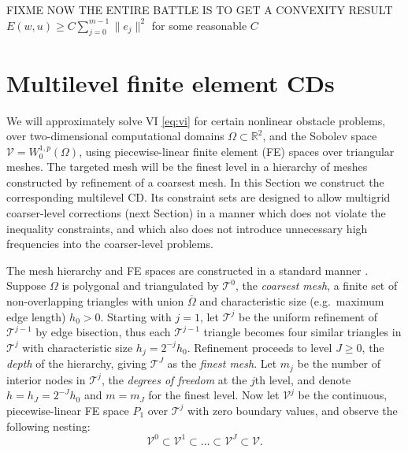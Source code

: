 \documentclass[letterpaper,final,12pt,reqno]{amsart}
\theoremstyle{cstyle}
\theoremstyle{cstyle*}
\theoremstyle{dstyle}
\numberwithin{equation}{section}
\numberwithin{figure}{section}
\numberwithin{table}{section}
\numberwithin{theorem}{section}
\newcommand{\RR}{\mathbb{R}}
\begin{document}
FIXME NOW THE ENTIRE BATTLE IS TO GET A CONVEXITY RESULT $E(w,u) \ge C \sum_{j=0}^{m-1} \|e_j\|^2$ for some reasonable $C$


\section{Multilevel finite element CDs} \label{sec:multilevel}

We will approximately solve VI \eqref{eq:vi} for certain nonlinear obstacle problems, over two-dimensional computational domains $\Omega \subset \RR^2$, and the Sobolev space $\mathcal{V}=W_0^{1,p}(\Omega)$, using piecewise-linear finite element (FE) spaces over triangular meshes.  The targeted mesh will be the finest level in a hierarchy of meshes constructed by refinement of a coarsest mesh.  In this Section we construct the corresponding multilevel CD.  Its constraint sets are designed to allow multigrid coarser-level corrections (next Section) in a manner which does not violate the inequality constraints, and which also does not introduce unnecessary high frequencies into the coarser-level problems.

The mesh hierarchy and FE spaces are constructed in a standard manner \cite{Elmanetal2014}.  Suppose $\Omega$ is polygonal and triangulated by $\mathcal{T}^0$, the \emph{coarsest mesh}, a finite set of non-overlapping triangles with union $\overline{\Omega}$ and characteristic size (e.g.~maximum edge length) $h_0>0$.  Starting with $j=1$, let $\mathcal{T}^j$ be the uniform refinement of $\mathcal{T}^{j-1}$ by edge bisection, thus each $\mathcal{T}^{j-1}$ triangle becomes four similar triangles in $\mathcal{T}^j$ with characteristic size $h_j = 2^{-j} h_0$.  Refinement proceeds to level $J\ge 0$, the \emph{depth} of the hierarchy, giving $\mathcal{T}^J$ as the \emph{finest mesh}.  Let $m_j$ be the number of interior nodes in $\mathcal{T}^j$, the \emph{degrees of freedom} at the $j$th level, and denote $h=h_J=2^{-J} h_0$ and $m=m_J$ for the finest level.  Now let $\mathcal{V}^j$ be the continuous, piecewise-linear FE space $P_1$ \cite{Elmanetal2014} over $\mathcal{T}^j$ with zero boundary values, and observe the following nesting:
\begin{equation}
\mathcal{V}^0 \subset \mathcal{V}^1 \subset \dots \subset \mathcal{V}^J \subset \mathcal{V}.  \label{eq:fe:nestedspaces}
\end{equation}
\end{document}
